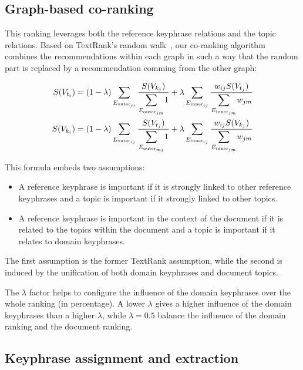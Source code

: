  \subsection{Graph-based co-ranking}
  \label{subsec:graph_based_co_ranking}
    This ranking leverages both the reference keyphrase relations and the topic
    relations. Based on TextRank's random walk~\cite{mihalcea2004textrank}, our
    co-ranking algorithm combines the recommendations within each graph in such
    a way that the random part is replaced by a recommendation comming from the
    other graph:
    \begin{tiny}
      \begin{align}
        S(V_{t_i}) &= (1 - \lambda) \sum_{E_{\text{outer}_{ji}}}{\frac{S(V_{k_j})}{\mathlarger\sum_{E_{\text{outer}_{jm}}}{1}}} + \lambda \sum_{E_{\text{inner}_{ij}}}{\frac{w_{ij} S(V_{t_j})}{\mathlarger\sum_{E_{\text{inner}_{jm}}}{{w_{jm}}}}}\\
        S(V_{k_i}) &= (1 - \lambda) \sum_{E_{\text{outer}_{ij}}}{\frac{S(V_{t_j})}{\mathlarger\sum_{E_{\text{outer}_{mj}}}{1}}} + \lambda \sum_{E_{\text{inner}_{ij}}}{\frac{w_{ij} S(V_{k_j})}{\mathlarger\sum_{E_{\text{inner}_{jm}}}{{w_{jm}}}}}
      \end{align}
    \end{tiny}
    This formula embeds two assumptions:
    \begin{itemize}
      \item{A reference keyphrase is important if it is strongly linked to other
            reference keyphrases and a topic is important if it strongly linked
            to other topics.}
      \item{A reference keyphrase is important in the context of the document if
            it is related to the topics within the document and a topic is
            important if it relates to domain keyphrases.}
    \end{itemize}
    The first assumption is the former TextRank assumption, while the second is
    induced by the unification of both domain keyphrases and document topics.

    The $\lambda$ factor helps to configure the influence of the domain
    keyphrases over the whole ranking (in percentage). A lower $\lambda$ gives a
    higher influence of the domain keyphrases than a higher $\lambda$, while
    $\lambda=0.5$ balance the influence of the domain ranking and the document
    ranking.

  \subsection{Keyphrase assignment and extraction}
  \label{subsec:keyphrase_assignment_and_extraction}

